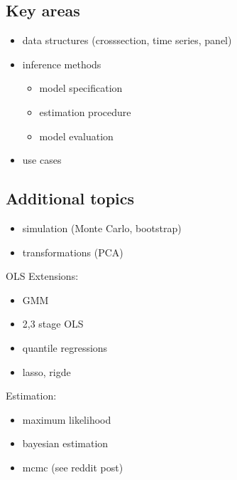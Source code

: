 \documentclass[letterpaper,10pt,english]{sphinxmanual}
\begin{document}
\subsection{Key areas}
\label{\detokenize{textbook/mindmap:key-areas}}\begin{itemize}
\item {} 
data structures (crosssection, time series, panel)

\item {} 
inference methods
\begin{itemize}
\item {} 
model specification

\item {} 
estimation procedure

\item {} 
model evaluation

\end{itemize}

\item {} 
use cases

\end{itemize}


\subsection{Additional topics}
\label{\detokenize{textbook/mindmap:additional-topics}}\begin{itemize}
\item {} 
simulation (Monte Carlo, bootstrap)

\item {} 
transformations (PCA)

\end{itemize}

OLS Extensions:
\begin{itemize}
\item {} 
GMM

\item {} 
2,3 stage OLS

\item {} 
quantile regressions

\item {} 
lasso, rigde

\end{itemize}

Estimation:
\begin{itemize}
\item {} 
maximum likelihood

\item {} 
bayesian estimation

\item {} 
mcmc (see reddit post)

\end{itemize}
\end{document}
